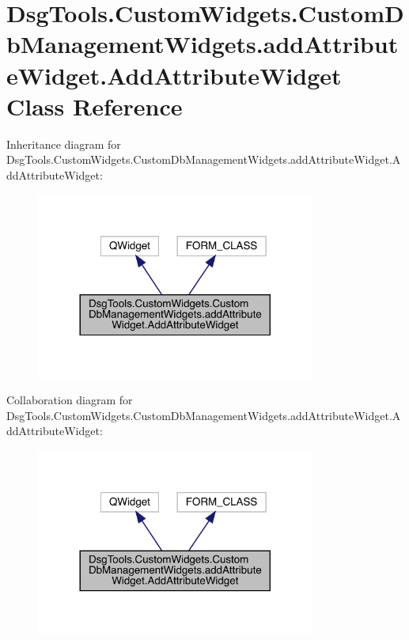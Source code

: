 \hypertarget{class_dsg_tools_1_1_custom_widgets_1_1_custom_db_management_widgets_1_1add_attribute_widget_1_1_add_attribute_widget}{}\section{Dsg\+Tools.\+Custom\+Widgets.\+Custom\+Db\+Management\+Widgets.\+add\+Attribute\+Widget.\+Add\+Attribute\+Widget Class Reference}
\label{class_dsg_tools_1_1_custom_widgets_1_1_custom_db_management_widgets_1_1add_attribute_widget_1_1_add_attribute_widget}


Inheritance diagram for Dsg\+Tools.\+Custom\+Widgets.\+Custom\+Db\+Management\+Widgets.\+add\+Attribute\+Widget.\+Add\+Attribute\+Widget\+:
\nopagebreak
\begin{figure}[H]
\begin{center}
\leavevmode
\includegraphics[width=260pt]{class_dsg_tools_1_1_custom_widgets_1_1_custom_db_management_widgets_1_1add_attribute_widget_1_1_0a9607b164a7769443ee1e30f9c5feee}
\end{center}
\end{figure}


Collaboration diagram for Dsg\+Tools.\+Custom\+Widgets.\+Custom\+Db\+Management\+Widgets.\+add\+Attribute\+Widget.\+Add\+Attribute\+Widget\+:
\nopagebreak
\begin{figure}[H]
\begin{center}
\leavevmode
\includegraphics[width=260pt]{class_dsg_tools_1_1_custom_widgets_1_1_custom_db_management_widgets_1_1add_attribute_widget_1_1_66c0e25c90dc5d9afec5e3a18fdf2870}
\end{center}
\end{figure}
